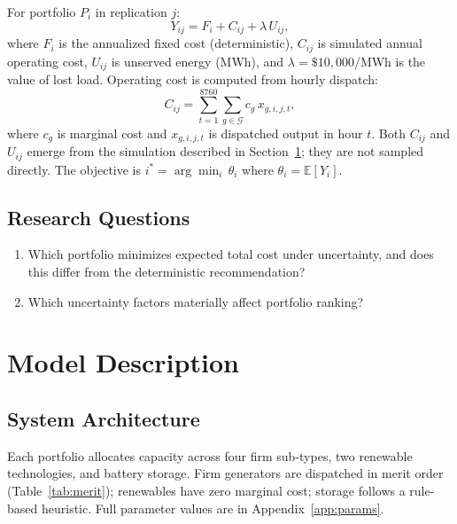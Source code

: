 \documentclass[11pt]{article}
\begin{document}
For portfolio $P_i$ in replication $j$:
\begin{equation}\label{eq:Y}
  Y_{ij} = F_i + C_{ij} + \lambda \, U_{ij},
\end{equation}
where $F_i$ is the annualized fixed cost (deterministic), $C_{ij}$ is simulated annual operating cost, $U_{ij}$ is unserved energy (MWh), and $\lambda = \$10{,}000$/MWh is the value of lost load. Operating cost is computed from hourly dispatch:
\begin{equation}\label{eq:C}
  C_{ij} = \sum_{t=1}^{8760} \sum_{g \in \mathcal{G}} c_g \, x_{g,i,j,t},
\end{equation}
where $c_g$ is marginal cost and $x_{g,i,j,t}$ is dispatched output in hour $t$. Both $C_{ij}$ and $U_{ij}$ emerge from the simulation described in Section~\ref{sec:model}; they are not sampled directly. The objective is $i^* = \arg\min_i \, \theta_i$ where $\theta_i = \mathbb{E}[Y_i]$.

\subsection{Research Questions}

\begin{enumerate}[leftmargin=*, itemsep=2pt]
  \item Which portfolio minimizes expected total cost under uncertainty, and does this differ from the deterministic recommendation?
  \item Which uncertainty factors materially affect portfolio ranking?
\end{enumerate}

\section{Model Description}\label{sec:model}

\subsection{System Architecture}

Each portfolio allocates capacity across four firm sub-types, two renewable technologies, and battery storage. Firm generators are dispatched in merit order (Table~\ref{tab:merit}); renewables have zero marginal cost; storage follows a rule-based heuristic. Full parameter values are in Appendix~\ref{app:params}.
\end{document}
